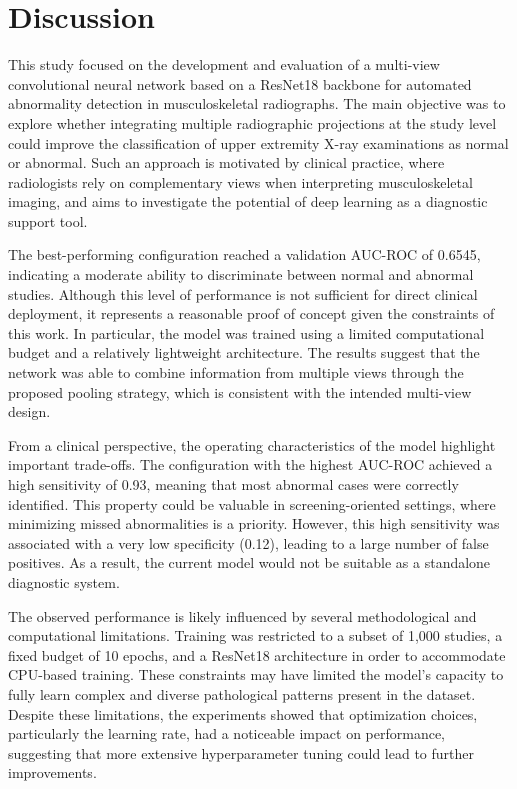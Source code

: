 \documentclass[12pt,a4paper]{article}
\begin{document}
\section{Discussion}
\label{sec:discussion}

This study focused on the development and evaluation of a multi-view convolutional neural network based on a ResNet18 backbone for automated abnormality detection in musculoskeletal radiographs. The main objective was to explore whether integrating multiple radiographic projections at the study level could improve the classification of upper extremity X-ray examinations as normal or abnormal. Such an approach is motivated by clinical practice, where radiologists rely on complementary views when interpreting musculoskeletal imaging, and aims to investigate the potential of deep learning as a diagnostic support tool.

The best-performing configuration reached a validation AUC-ROC of 0.6545, indicating a moderate ability to discriminate between normal and abnormal studies. Although this level of performance is not sufficient for direct clinical deployment, it represents a reasonable proof of concept given the constraints of this work. In particular, the model was trained using a limited computational budget and a relatively lightweight architecture. The results suggest that the network was able to combine information from multiple views through the proposed pooling strategy, which is consistent with the intended multi-view design.

From a clinical perspective, the operating characteristics of the model highlight important trade-offs. The configuration with the highest AUC-ROC achieved a high sensitivity of 0.93, meaning that most abnormal cases were correctly identified. This property could be valuable in screening-oriented settings, where minimizing missed abnormalities is a priority. However, this high sensitivity was associated with a very low specificity (0.12), leading to a large number of false positives. As a result, the current model would not be suitable as a standalone diagnostic system.

The observed performance is likely influenced by several methodological and computational limitations. Training was restricted to a subset of 1,000 studies, a fixed budget of 10 epochs, and a ResNet18 architecture in order to accommodate CPU-based training. These constraints may have limited the model’s capacity to fully learn complex and diverse pathological patterns present in the dataset. Despite these limitations, the experiments showed that optimization choices, particularly the learning rate, had a noticeable impact on performance, suggesting that more extensive hyperparameter tuning could lead to further improvements.
\end{document}
